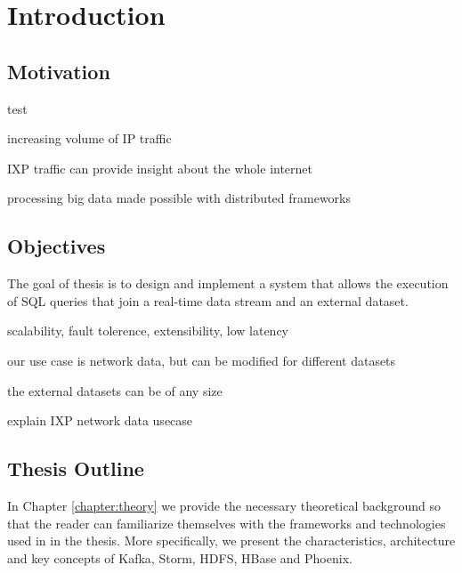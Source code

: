 \chapter{Introduction}\label{chapter:introduction}

\section{Motivation}

test\cite{geolite}

increasing volume of IP traffic

IXP traffic can provide insight about the whole internet

processing big data made possible with distributed frameworks


\section{Objectives}

The goal of thesis is to design and implement a system that allows the execution of SQL queries that join a real-time data stream and an external dataset.

scalability, fault tolerence, extensibility, low latency

our use case is network data, but can be modified for different datasets

the external datasets can be of any size

explain IXP network data usecase


\section{Thesis Outline}

In Chapter \ref{chapter:theory} we provide the necessary theoretical background so that the reader can familiarize themselves with the frameworks and technologies used in in the thesis. More specifically, we present the characteristics, architecture and key concepts of Kafka, Storm, HDFS, HBase and Phoenix.


\cleardoublepage
